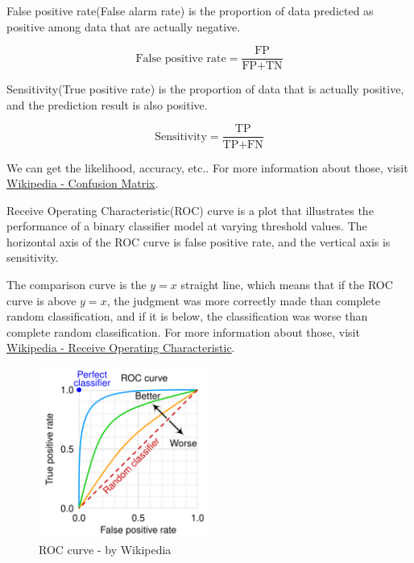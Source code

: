 False positive rate(False alarm rate) is the proportion of data predicted as positive among data that are actually negative.

\begin{equation}
    \text{False positive rate} = \frac{\text{FP}}{\text{FP} + \text{TN}}
\end{equation}

Sensitivity(True positive rate) is the proportion of data that is actually positive, and the prediction result is also positive.

\begin{equation}
    \text{Sensitivity} = \frac{\text{TP}}{\text{TP} + \text{FN}}
\end{equation}

We can get the likelihood, accuracy, etc.. For more information about those, visit \href{https://en.wikipedia.org/wiki/Confusion_matrix}{Wikipedia - Confusion Matrix}.

Receive Operating Characteristic(ROC) curve is a plot that illustrates the performance of a binary classifier model at varying threshold values. The horizontal axis of the ROC curve is false positive rate, and the vertical axis is sensitivity.

The comparison curve is the $y=x$ straight line, which means that if the ROC curve is above $y=x$, the judgment was more correctly made than complete random classification, and if it is below, the classification was worse than complete random classification. For more information about those, visit \href{https://en.wikipedia.org/wiki/Receiver_operating_characteristic}{Wikipedia - Receive Operating Characteristic}.

\begin{figure}[h]
\centering
\includegraphics[width=0.5\textwidth]{figs/roc.png}
\caption{ROC curve - by Wikipedia}\label{roc}
\end{figure}
